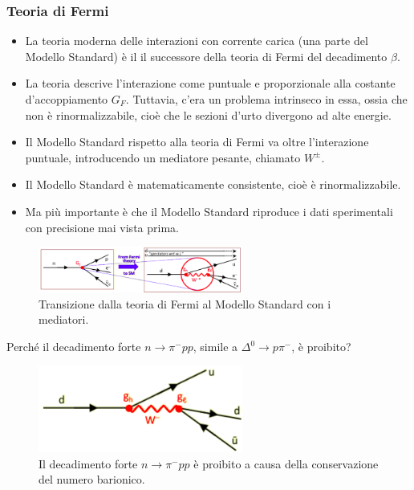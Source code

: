 \subsubsection{Teoria di Fermi}
\begin{itemize}
    \item La teoria moderna delle interazioni con corrente carica (una parte del Modello Standard) è il il successore della teoria di Fermi del decadimento $\beta$. 
    \item La teoria descrive l'interazione come puntuale e proporzionale alla costante d'accoppiamento $G_F$. Tuttavia, c'era un problema intrinseco in essa, ossia che non è rinormalizzabile, cioè che le sezioni d'urto divergono ad alte energie.
    \item Il Modello Standard rispetto alla teoria di Fermi va oltre l'interazione puntuale, introducendo un mediatore pesante, chiamato $W^\pm$.
    \item Il Modello Standard è matematicamente consistente, cioè è rinormalizzabile.
    \item Ma più importante è che il Modello Standard riproduce i dati sperimentali con precisione mai vista prima.
\end{itemize}
\begin{figure}[H]
    \centering
    \includegraphics[width=0.6\textwidth]{immagini/fig_fermi_to_ms.png}
    \caption{Transizione dalla teoria di Fermi al Modello Standard con i mediatori.}
\end{figure}
Perché il decadimento forte $n\to \pi^-pp$, simile a $\Delta^0\to p\pi^-$, è proibito?
\begin{figure}[H]
    \centering
    \includegraphics[width=0.6\textwidth]{immagini/fig_n_p_pi.png}
    \caption{Il decadimento forte $n\to \pi^-pp$ è proibito a causa della conservazione del numero barionico.}
\end{figure}